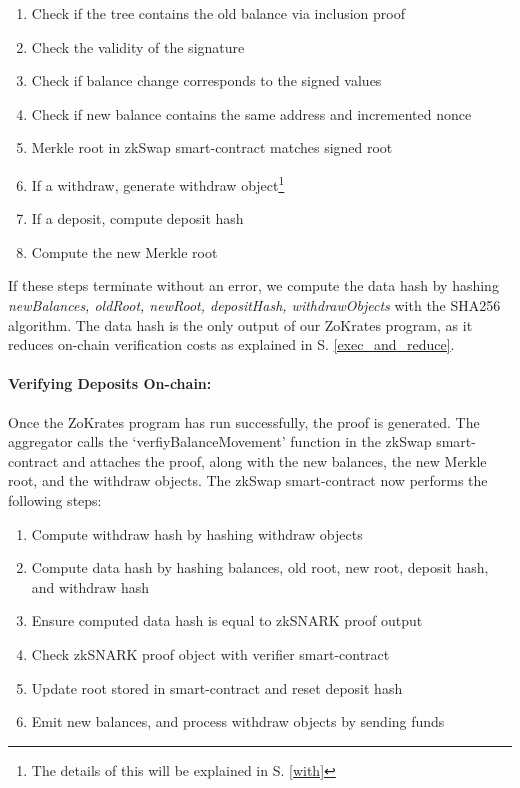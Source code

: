 \documentclass[../../thesis.tex]{subfiles}
\begin{document}
\begin{enumerate}
    \item Check if the tree contains the old balance via inclusion proof
    \item Check the validity of the signature
    \item Check if balance change corresponds to the signed values
    \item Check if new balance contains the same address and incremented nonce
    \item Merkle root in zkSwap smart-contract matches signed root
    \item If a withdraw, generate withdraw object\footnote{The details of this will be explained in S. \ref{with}}
    \item If a deposit, compute deposit hash
    \item Compute the new Merkle root
\end{enumerate}

If these steps terminate without an error, we compute the data hash by hashing \textit{newBalances, oldRoot, newRoot, depositHash, withdrawObjects} with the SHA256 algorithm. The data hash is the only output of our ZoKrates program, as it reduces on-chain verification costs as explained in S. \ref{exec_and_reduce}.

\paragraph{Verifying Deposits On-chain:} 
Once the ZoKrates program has run successfully, the proof is generated. The aggregator calls the `verfiyBalanceMovement' function in the zkSwap smart-contract and attaches the proof, along with the new balances, the new Merkle root, and the withdraw objects. The zkSwap smart-contract now performs the following steps:

\begin{enumerate}
    \item Compute withdraw hash by hashing withdraw objects
    \item Compute data hash by hashing balances, old root, new root, deposit hash, and withdraw hash
    \item Ensure computed data hash is equal to zkSNARK proof output
    \item Check zkSNARK proof object with verifier smart-contract
    \item Update root stored in smart-contract and reset deposit hash
    \item Emit new balances, and process withdraw objects by sending funds
\end{enumerate}
\end{document}
